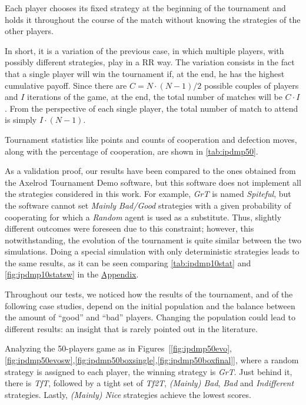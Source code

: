 \documentclass[journal,10pt,twoside]{IEEEtran}
\begin{document}
Each player chooses its fixed strategy at the beginning of the tournament and holds it throughout the course of the match without knowing the strategies of the other players.

In short, it is a variation of the previous case, in which multiple players, with possibly different strategies, play in a RR way. The variation consists in the fact that a single player will win the tournament if, at the end, he has the highest cumulative payoff.
Since there are $C=N\cdot (N-1)/2$ possible couples of players and $I$ iterations of the game, at the end, the total number of matches will be $C\cdot I$. From the perspective of each single player, the total number of match to attend is simply $I\cdot(N-1)$.

Tournament statistics like points and counts of cooperation and defection moves, along with the percentage of cooperation, are shown in \autoref{tab:ipdmp50}.

As a validation proof, our results have been compared to the ones obtained from the Axelrod Tournament Demo software, \cite{demosw} but this software does not implement all the strategies considered in this work. For example, \textit{GrT} is named \textit{Spiteful}, but the software cannot set \textit{Mainly Bad/Good} strategies with a given probability of cooperating for which a \textit{Random} agent is used as a substitute. Thus, slightly different outcomes were foreseen due to this constraint; however, this notwithstanding, the evolution of the tournament is quite similar between the two simulations.
Doing a special simulation with only deterministic strategies leads to the same results, as it can be seen comparing \autoref{tab:ipdmp10stat} and \autoref{fig:ipdmp10statsw} in the \hyperref[s:appendix]{Appendix}.

Throughout our tests, we noticed how the results of the tournament, and of the following case studies, depend on the initial population and the balance between the amount of ``good'' and ``bad'' players. Changing the population could lead to different results: an insight that is rarely pointed out in the literature.

Analyzing the 50-players game as in Figures~[\ref{fig:ipdmp50evo},\ref{fig:ipdmp50evosw},\ref{fig:ipdmp50boxsingle},\ref{fig:ipdmp50boxfinal}], where a random strategy is assigned to each player, the winning strategy is \textit{GrT}. Just behind it, there is \textit{TfT}, followed by a tight set of \textit{Tf2T}, \textit{(Mainly) Bad}, \textit{Bad} and \textit{Indifferent} strategies. Lastly, \textit{(Mainly) Nice} strategies achieve the lowest scores.
\end{document}

